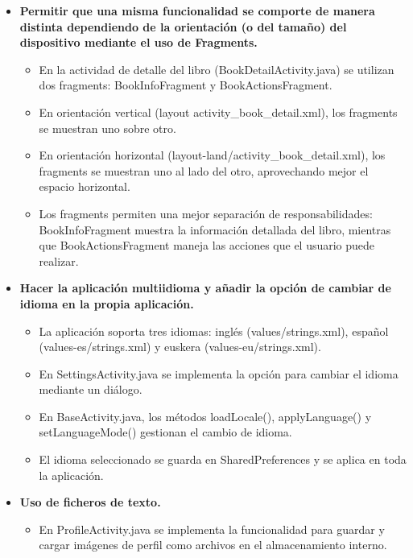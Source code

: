\documentclass[a4paper,12pt]{report}
\begin{document}
      \begin{itemize}
        \item \textbf{Permitir que una misma funcionalidad se comporte de manera distinta dependiendo de la orientación (o del tamaño) del dispositivo mediante el uso de Fragments.}
        \begin{itemize}
          \item En la actividad de detalle del libro (BookDetailActivity.java) se utilizan dos fragments: BookInfoFragment y BookActionsFragment\cite{android_fragments}.
          \item En orientación vertical (layout activity\_book\_detail.xml), los fragments se muestran uno sobre otro.
          \item En orientación horizontal (layout-land/activity\_book\_detail.xml), los fragments se muestran uno al lado del otro, aprovechando mejor el espacio horizontal.
          \item Los fragments permiten una mejor separación de responsabilidades: BookInfoFragment muestra la información detallada del libro, mientras que BookActionsFragment maneja las acciones que el usuario puede realizar.
        \end{itemize}
        \item \textbf{Hacer la aplicación multiidioma y añadir la opción de cambiar de idioma en la propia aplicación.}
        \begin{itemize}
          \item La aplicación soporta tres idiomas: inglés (values/strings.xml), español (values-es/strings.xml) y euskera (values-eu/strings.xml)\cite{android_localization}.
          \item En SettingsActivity.java se implementa la opción para cambiar el idioma mediante un diálogo.
          \item En BaseActivity.java, los métodos loadLocale(), applyLanguage() y setLanguageMode() gestionan el cambio de idioma.
          \item El idioma seleccionado se guarda en SharedPreferences y se aplica en toda la aplicación.
        \end{itemize}
        \item \textbf{Uso de ficheros de texto.}
        \begin{itemize}
          \item En ProfileActivity.java se implementa la funcionalidad para guardar y cargar imágenes de perfil como archivos en el almacenamiento interno.

\end{itemize}
\end{itemize}
\end{document}
